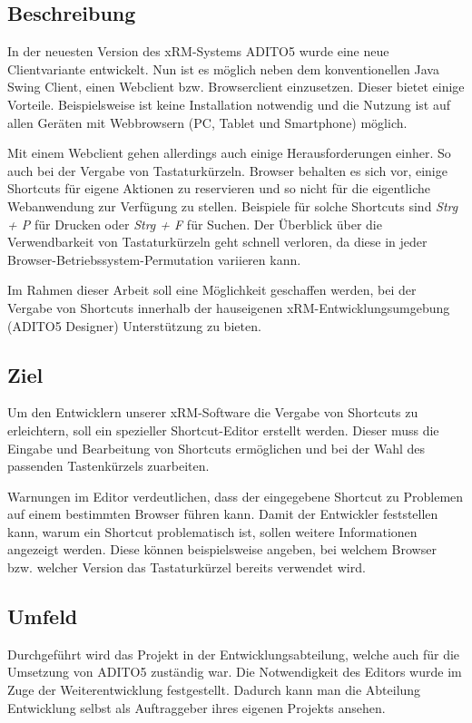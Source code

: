 \subsection{Beschreibung}
 
In der neuesten Version des xRM-Systems ADITO5 wurde eine neue Clientvariante entwickelt. Nun ist es möglich neben dem konventionellen Java Swing Client, einen Webclient bzw. Browserclient einzusetzen. Dieser bietet einige Vorteile. Beispielsweise ist keine Installation notwendig und die Nutzung ist auf allen Geräten mit Webbrowsern (PC, Tablet und Smartphone) möglich. 

Mit einem Webclient gehen allerdings auch einige Herausforderungen einher. So auch bei der Vergabe von Tastaturkürzeln. Browser behalten es sich vor, einige Shortcuts für eigene Aktionen zu reservieren und so nicht für die eigentliche Webanwendung zur Verfügung zu stellen. Beispiele für solche Shortcuts sind \emph{Strg + P} für Drucken oder \emph{Strg + F} für Suchen. Der Überblick über die Verwendbarkeit von Tastaturkürzeln geht schnell verloren, da diese in jeder Browser-Betriebssystem-Permutation variieren kann.

Im Rahmen dieser Arbeit soll eine Möglichkeit geschaffen werden, bei der Vergabe von Shortcuts innerhalb der hauseigenen xRM-Entwicklungsumgebung (ADITO5 Designer) Unterstützung zu bieten.

\subsection{Ziel}

Um den Entwicklern unserer xRM-Software die Vergabe von Shortcuts zu erleichtern, soll ein spezieller Shortcut-Editor erstellt werden. Dieser muss die Eingabe und Bearbeitung von Shortcuts ermöglichen und bei der Wahl des passenden Tastenkürzels zuarbeiten.

Warnungen im Editor verdeutlichen, dass der eingegebene Shortcut zu Problemen auf einem bestimmten Browser führen kann. Damit der Entwickler feststellen kann, warum ein Shortcut problematisch ist, sollen weitere Informationen angezeigt werden. Diese können beispielsweise angeben, bei welchem Browser bzw. welcher Version das Tastaturkürzel bereits verwendet wird.

\subsection{Umfeld}

Durchgeführt wird das Projekt in der Entwicklungsabteilung, welche auch für die Umsetzung von ADITO5 zuständig war. Die Notwendigkeit des Editors wurde im Zuge der Weiterentwicklung festgestellt. Dadurch kann man die Abteilung Entwicklung selbst als Auftraggeber ihres eigenen Projekts ansehen.

